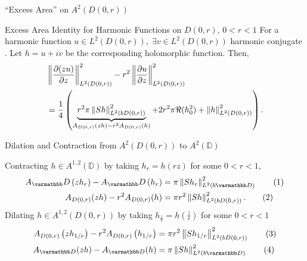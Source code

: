 \documentclass{reu_beamer}
\begin{document}
\begin{frame}{``Excess Area'' on $A^{2}(D(0,r))$}
    \begin{block}{Excess Area Identity for Harmonic Functions on $D(0,r)$, $0 < r < 1$}
    \small
        For a harmonic function $u\in L^2(D(0,r)),\;\exists v\in L^{2}\left(D(0,r)\right)$ harmonic conjugate \cite{bambico2022generalization}. Let $h=u+iv$ be the corresponding holomorphic function. Then, 
        \begin{align*}
            &\left\Vert \frac{\partial (zu)}{\partial z} \right\Vert^2_{L^2(D(0,r))}-r^2\left\Vert \frac{\partial u}{\partial z} \right\Vert^2_{L^2(D(0,r))}\\
            &=\frac{1}{4}\left(\underbrace{r^2\pi\left\Vert Sh \right\Vert_{L^2(b D(0,r))}^2}_{A_{D(0,r)}(zh) - r^2A_{D(0,r)}(h)}+2r^2\pi\Re(h_0^2)+\left\Vert h \right\Vert^2_{L^2(D(0,r))}\right).
        \end{align*}
    \end{block}
\end{frame}
\begin{frame}{Dilation and Contraction from $A^2(D(0,r))$ to $A^2(\mathbb{D})$}

    Contracting $h\in A^{1, 2}(\mathbb{D})$ by taking $h_r = h(rz)$ for some \(0 < r < 1\),
    \begin{align*}
        A_\disc\left(zh_{r}\right) - A_\disc\left(h_{r}\right) &= \pi \norm{Sh_{r}}_{L^2(b\mathbb{D})}^2\tag{1}\\
        A_{D(0,r)}(zh) - r^2 A_{D(0,r)}(h) &= \pi r^2 \norm{Sh}_{L^{2}(bD(0,r))}^2.\tag{2}
    \end{align*}
    Dilating $h \in A^{1,2}(D(0,r))$ by taking $h_{\frac{1}{r}}=h(\frac{z}{r})$ for some $0 < r < 1$
    \begin{align*}
        A_{D(0,r)}\left(zh_{1/r}\right) - r^2A_{D(0,r)}\left(h_{1/r}\right) &= \pi r^2 \norm{Sh_{1/r}}_{L^{2}(bD(0,r))}^2\tag{3}\\
        A_{\mathbb{D}}(zh) - A_{\mathbb{D}}(h) &= \pi \norm{Sh}_{L^{2}(b\mathbb{D})}^2\tag{4}
    \end{align*}
\end{frame}
\end{document}
